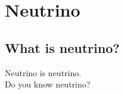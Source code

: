 
%
%

\section{Neutrino}\label{AppA}

\subsection{What is neutrino?}
\vs\hs Neutrino is neutrino.\\
Do you know neutrino?

\newpage
